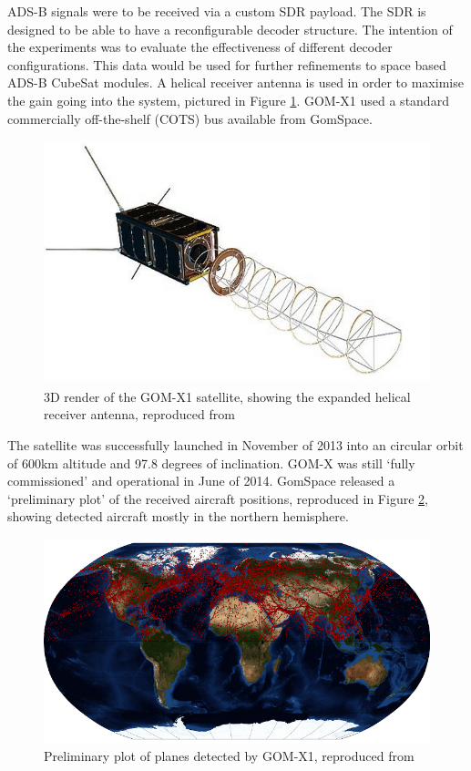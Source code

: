 ADS-B signals were to be received via a custom SDR payload. The SDR is designed to be able to have a reconfigurable decoder structure. The intention of the experiments was to evaluate the effectiveness of different decoder configurations. This data would be used for further refinements to space based ADS-B CubeSat modules. A helical receiver antenna is used in order to maximise the gain going into the system, pictured in Figure \ref{fig:gomx_antenna}.  GOM-X1 used a standard commercially off-the-shelf (COTS) bus available from GomSpace\cite{Alminde2012}.
\begin{figure}[H]
	\centering
	\includegraphics[scale = 0.5]{Pictures/gomx_antenna.png}
	
	\caption[3D render of the GOM-X1 satellite, showing the expanded helical receiver antenna]{3D render of the GOM-X1 satellite, showing the expanded helical receiver antenna, reproduced from \cite{GomSpace2014}}
	\label{fig:gomx_antenna}
\end{figure}
The satellite was successfully launched in November of 2013 into an circular orbit of 600km altitude and 97.8 degrees of inclination. GOM-X was still `fully commissioned' and operational in June of 2014\cite{EoPortal, GomSpace2014}. GomSpace released a `preliminary plot' of the received aircraft positions, reproduced in Figure \ref{fig:gomx_planes}, showing detected aircraft mostly in the northern hemisphere. 

\begin{figure}[htbp]
	\centering
	\includegraphics[scale = 0.8]{Pictures/gomx_planes.png}
	
	\caption[Preliminary plot of planes detected by GOM-X1]{Preliminary plot of planes detected by GOM-X1, reproduced from \cite{GomSpace2014}}
	\label{fig:gomx_planes}
\end{figure}

